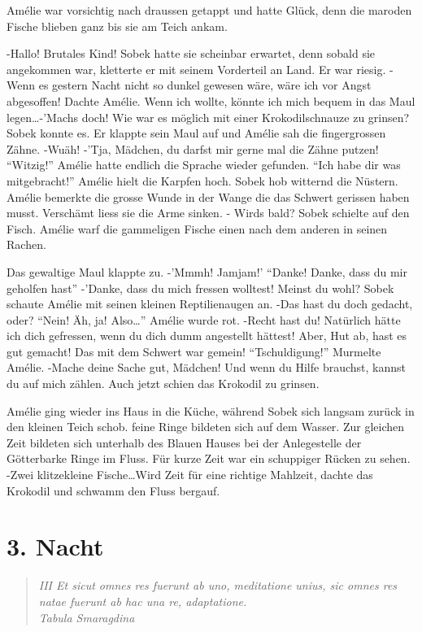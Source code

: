 \documentclass[11pt,titlepage,a5paper]{book}
\begin{document}
Amélie war vorsichtig nach draussen getappt und hatte Glück, denn die maroden Fische blieben ganz bis sie am Teich ankam.

-Hallo! Brutales Kind! Sobek hatte sie scheinbar erwartet, denn sobald sie angekommen war, kletterte er mit seinem Vorderteil an Land. Er war riesig. -Wenn es gestern Nacht nicht so dunkel gewesen wäre, wäre ich vor Angst abgesoffen! Dachte Amélie. Wenn ich wollte, könnte ich mich bequem in das Maul legen\dots -'Machs doch! Wie war es möglich mit einer Krokodilschnauze zu grinsen? Sobek konnte es. Er klappte sein Maul auf und Amélie sah die fingergrossen Zähne. -Wuäh! -'Tja, Mädchen, du darfst mir gerne mal die Zähne putzen! "`Witzig!"' Amélie hatte endlich die Sprache wieder gefunden. "`Ich habe dir was mitgebracht!"' Amélie hielt die Karpfen hoch. Sobek hob witternd die Nüstern. Amélie bemerkte die grosse Wunde in der Wange die das Schwert gerissen haben musst. Verschämt liess sie die Arme sinken. - Wirds bald? Sobek schielte auf den Fisch. Amélie warf die gammeligen Fische einen nach dem anderen in seinen Rachen.

Das gewaltige Maul klappte zu. -'Mmmh! Jamjam!' "`Danke! Danke, dass du mir geholfen hast"' -'Danke, dass du mich fressen wolltest! Meinst du wohl? Sobek schaute Amélie mit seinen kleinen Reptilienaugen an. -Das hast du doch gedacht, oder? "`Nein! Äh, ja! Also\dots"' Amélie wurde rot. -Recht hast du! Natürlich hätte ich dich gefressen, wenn du dich dumm angestellt hättest! Aber, Hut ab, hast es gut gemacht! Das mit dem Schwert war gemein! "`Tschuldigung!"' Murmelte Amélie. -Mache deine Sache gut, Mädchen! Und wenn du Hilfe brauchst, kannst du auf mich zählen. Auch jetzt schien das Krokodil zu grinsen.

Amélie ging wieder ins Haus in die Küche, während Sobek sich langsam zurück in den kleinen Teich schob. feine Ringe bildeten sich auf dem Wasser. Zur gleichen Zeit bildeten sich unterhalb des Blauen Hauses bei der Anlegestelle der Götterbarke Ringe im Fluss. Für kurze Zeit war ein schuppiger Rücken zu sehen. -Zwei klitzekleine Fische\dots Wird Zeit für eine richtige Mahlzeit, dachte das Krokodil und schwamm den Fluss bergauf. 

\chapter*{3. Nacht}


\begin{quotation}

\emph{III Et sicut omnes res fuerunt ab uno, meditatione unius, sic omnes res natae fuerunt ab hac una re, adaptatione. \\Tabula Smaragdina}

\end{quotation}
\end{document}
